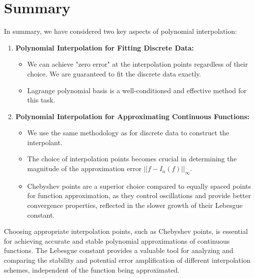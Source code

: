 \documentclass{article}
\begin{document}
\section{Summary}

In summary, we have considered two key aspects of polynomial interpolation:

\begin{enumerate}
    \item \textbf{Polynomial Interpolation for Fitting Discrete Data:}
    \begin{itemize}
        \item We can achieve "zero error" at the interpolation points regardless of their choice. We are guaranteed to fit the discrete data exactly.
        \item Lagrange polynomial basis is a well-conditioned and effective method for this task.
    \end{itemize}
    \item \textbf{Polynomial Interpolation for Approximating Continuous Functions:}
    \begin{itemize}
        \item We use the same methodology as for discrete data to construct the interpolant.
        \item The choice of interpolation points becomes crucial in determining the magnitude of the approximation error $||f - I_n(f)||_{\infty}$.
        \item Chebyshev points are a superior choice compared to equally spaced points for function approximation, as they control oscillations and provide better convergence properties, reflected in the slower growth of their Lebesgue constant.
    \end{itemize}
\end{enumerate}

Choosing appropriate interpolation points, such as Chebyshev points, is essential for achieving accurate and stable polynomial approximations of continuous functions. The Lebesgue constant provides a valuable tool for analyzing and comparing the stability and potential error amplification of different interpolation schemes, independent of the function being approximated.
\end{document}
